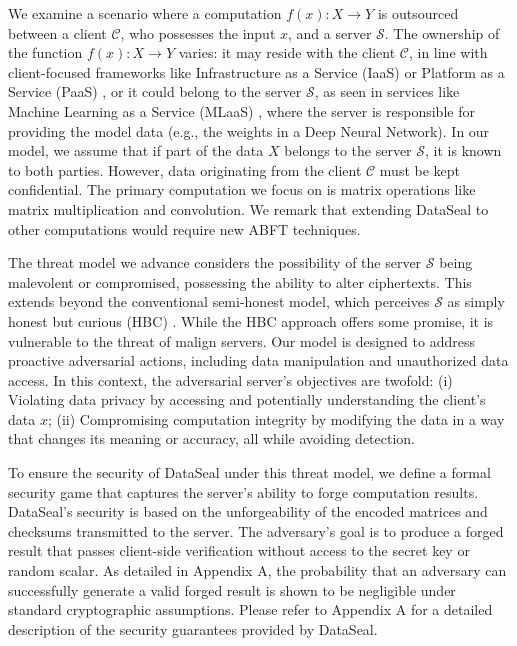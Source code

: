 We examine a scenario where a computation \( f(x): X \rightarrow Y \) is outsourced between a client \( \mathcal{C} \), who possesses the input \( x \), and a server \( \mathcal{S} \). The ownership of the function \( f(x): X \rightarrow Y \) varies: it may reside with the client \( \mathcal{C} \), in line with client-focused frameworks like Infrastructure as a Service (IaaS) \cite{serrano2015infrastructure} or Platform as a Service (PaaS) \cite{keller2010platform}, or it could belong to the server \( \mathcal{S} \), as seen in services like Machine Learning as a Service (MLaaS) \cite{ribeiro2015mlaas}, where the server is responsible for providing the model data (e.g., the weights in a Deep Neural Network). In our model, we assume that if part of the data \( X \) belongs to the server \( \mathcal{S} \), it is known to both parties. However, data originating from the client \( \mathcal{C} \) must be kept confidential. The primary computation we focus on is matrix operations like matrix multiplication and convolution. We remark that extending DataSeal to other computations would require new ABFT techniques.

The threat model we advance considers the possibility of the server \( \mathcal{S} \) being malevolent or compromised, possessing the ability to alter ciphertexts. This extends beyond the conventional semi-honest model, which perceives \( \mathcal{S} \) as simply honest but curious (HBC) \cite{le2023privacy,dong2022fusion, badolato2022privacy}. While the HBC approach offers some promise, it is vulnerable to the threat of malign servers. Our model is designed to address proactive adversarial actions, including data manipulation and unauthorized data access. In this context, the adversarial server's objectives are twofold: (i) Violating data privacy by accessing and potentially understanding the client's data $x$; (ii) Compromising computation integrity by modifying the data in a way that changes its meaning or accuracy, all while avoiding detection. 

To ensure the security of DataSeal under this threat model, we define a formal security game that captures the server's ability to forge computation results. DataSeal's security is based on the unforgeability of the encoded matrices and checksums transmitted to the server. The adversary’s goal is to produce a forged result that passes client-side verification without access to the secret key or random scalar. As detailed in Appendix A, the probability that an adversary can successfully generate a valid forged result is shown to be negligible under standard cryptographic assumptions. Please refer to Appendix A for a detailed description of the security guarantees provided by DataSeal.



